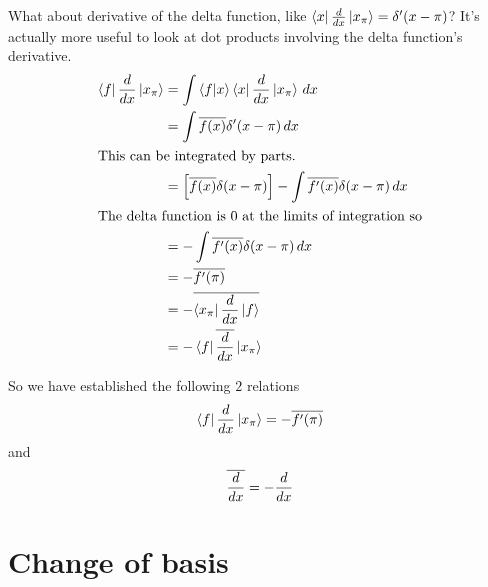 \documentclass[12pt, oneside, letterpaper, fleqn]{article}
\begin{document}
What about derivative of the delta function, like
$\left\langle x\right\rvert\frac{d }{dx}\left\lvert x_\pi\right\rangle = \delta'(x - \pi)$? It's actually more useful
to look at dot products involving the delta function's derivative.
\begin{align*}
\left\langle f\right\rvert\frac{d }{dx}\left\lvert x_\pi\right\rangle &= \int
\left\langle f\middle\vert x\right\rangle\left\langle x\right\rvert\frac{d }{dx}\left\lvert x_\pi\right\rangle\,dx\\
&= \int \overline{f(x)} \delta'(x-\pi)\,dx\\
\intertext{This can be integrated by parts.}
&= \left[\overline{f(x)} \delta(x-\pi)\right] - \int \overline{f'(x)}
\delta(x-\pi)\,dx\\
\intertext{The delta function is $0$ at the limits of integration so}
&= -\int \overline{f'(x)}\delta(x-\pi)\,dx\\
&= -\overline{f'(\pi)}\\
&= -\overline{\left\langle x_\pi\right\rvert\frac{d }{dx}\left\lvert f\right\rangle}\\
&= -\left\langle f\right\rvert\overline{\frac{d }{dx}}\left\lvert x_\pi\right\rangle
\end{align*}

So we have established the following $2$ relations
\begin{align}\label{eq:dot_delta_deriv}
\left\langle f\right\rvert\frac{d }{dx}\left\lvert x_\pi\right\rangle = -\overline{f'(\pi)}
\end{align}
and
\begin{align}
\overline{\frac{d }{dx}} = -\frac{d }{dx}
\end{align}

\section{Change of basis}
\end{document}
